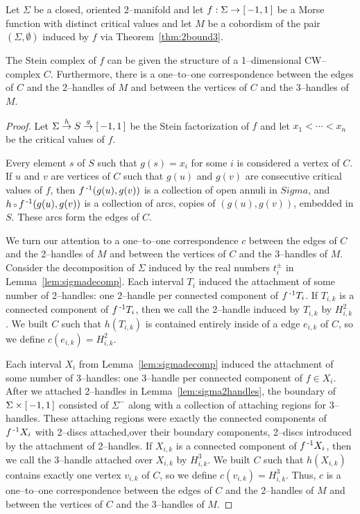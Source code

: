 \begin{lem}
	\label{lem:complexcorresp}
	Let $\Sigma$ be a closed, oriented 2--manifold and let $f:\Sigma\to[\,-1,1\,]$ be a Morse function with distinct critical values and let $M$ be a cobordism of the pair $(\Sigma,\emptyset)$ induced by $f$ via Theorem~\ref{thm:2bound3}.
	
	The Stein complex of $f$ can be given the structure of a 1--dimensional CW--complex $C$.
	Furthermore, there is a one--to--one correspondence between the edges of $C$ and the 2--handles of $M$ and between the vertices of $C$ and the 3--handles of $M$.
\end{lem}

\begin{proof}
	Let $\Sigma\overset{h}{\to}S\overset{g}{\to}[\,-1,1\,]$ be the Stein factorization of $f$ and let $x_1<\cdots<x_n$ be the critical values of $f$.

	Every element $s$ of $S$ such that $g(s)=x_i$ for some $i$ is considered a vertex of $C$.
	If $u$ and $v$ are vertices of $C$ such that $g(u)$ and $g(v)$ are consecutive critical values of $f$, then $f^{\,\text{-}1} (g(u),g(v))$ is a collection of open annuli in $Sigma$, and $h\comp f\inv (g(u),g(v))$ is a collection of arcs, copies of $(g(u),g(v))$, embedded in $S$.
	These arcs form the edges of $C$.
	
	We turn our attention to a one--to--one correspondence $c$ between the edges of $C$ and the 2--handles of $M$ and between the vertices of $C$ and the 3--handles of $M$.
	Consider the decomposition of $\Sigma$ induced by the real numbers $t_i^\pm$ in Lemma~\ref{lem:sigmadecomp}.
	Each interval $T_i$ induced the attachment of some number of 2--handles: one 2--handle per connected component of $f^{\,\text{-}1} T_i$.
	If $T_{i,k}$ is a connected component of $f^{\,\text{-}1} T_i$, then we call the 2--handle induced by $T_{i,k}$ by $H_{i,k}^2$.
	We built $C$ such that $h(T_{i,k})$ is contained entirely inside of a edge $e_{i,k}$ of $C$, so we define $c(e_{i,k})=H_{i,k}^2$.
	
	Each interval $X_i$ from Lemma~\ref{lem:sigmadecomp} induced the attachment of some number of 3--handles: one 3--handle per connected component of $f\in X_i$.
	After we attached 2--handles in Lemma~\ref{lem:sigma2handles}, the boundary of $\Sigma\times[\,-1,1\,]$ consisted of $\Sigma^-$ along with a collection of attaching regions for 3--handles.
	These attaching regions were exactly the connected components of $f^{\,\text{-}1} X_i$ with 2--discs attached,over their boundary components, 2--discs introduced by the attachment of 2--handles.
	If $X_{i,k}$ is a connected component of $f^{\,\text{-}1} X_i$, then we call the 3--handle attached over $X_{i,k}$ by $H_{i,k}^3$.
	We built $C$ such that $h(X_{i,k})$ contains exactly one vertex $v_{i,k}$ of $C$, so we define $c(v_{i,k})=H_{i,k}^3$.
	Thus, $c$ is a one--to--one correspondence between the edges of $C$ and the 2--handles of $M$ and between the vertices of $C$ and the 3--handles of $M$.
\end{proof}


